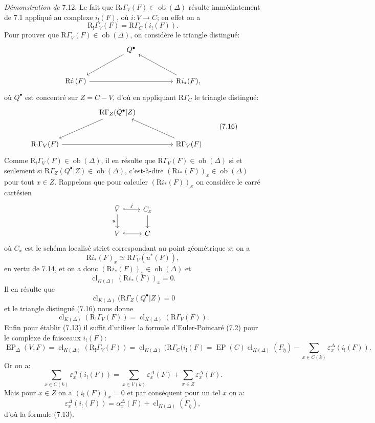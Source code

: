 \documentclass[11pt]{article}
\newcommand{\R}{\mathbb{R}}\newcommand{\RHomCore}{\mathbb{R}\mathrm{Hom}}
\providecommand{\EP}{\operatorname{EP}}
\providecommand{\Ob}{\operatorname{ob}}
\providecommand{\Ob}{\operatorname{ob}}
\providecommand{\R}{\mathrm R}
\providecommand{\EP}{\operatorname{EP}}
\providecommand{\Ob}{\operatorname{Ob}}
\providecommand{\clK}[1]{\operatorname{cl}_{K(#1)}}
\providecommand{\RG}{\R\Gamma}
\providecommand{\Ob}{\operatorname{ob}}
\providecommand{\Ob}{\operatorname{Ob}}
\begin{document}
\emph{Démonstration de} 7.12. Le fait que $\mathrm{R}_!\Gamma_V(F)\in\Ob(\Delta)$ résulte immédiatement de 7.1 appliqué au complexe $i_!(F)$, où $i:V\to C$; en effet on a
\[
\mathrm{R}_!\Gamma_V(F)=\mathrm{R}\Gamma_C(i_!(F)).
\]
Pour prouver que $\mathrm{R}\Gamma_V(F)\in\Ob(\Delta)$, on considère le triangle distingué:
\[
\begin{tikzcd}[column sep=huge,row sep=large]
& Q^\bullet \arrow[dl] &\\
\mathrm{R} i_!(F) \arrow[rr] && \mathrm{R} i_*(F) \arrow[ul],
\end{tikzcd}
\]
où $Q^\bullet$ est concentré sur $Z=C-V$, d'où en appliquant $\mathrm{R}\Gamma_C$ le triangle distingué:
\[
\begin{tikzcd}[column sep=huge,row sep=large]
& \mathrm{R}\Gamma_Z(Q^\bullet|Z) \arrow[dl] &\\
\mathrm{R}_!\Gamma_V(F) \arrow[rr] && \RG_V(F) \arrow[ul]
\end{tikzcd}
\tag{7.16}
\]
Comme $\mathrm{R}_!\Gamma_V(F)\in\Ob(\Delta)$, il en résulte que $\mathrm{R}\Gamma_V(F)\in\Ob(\Delta)$ si et seulement si $\mathrm{R}\Gamma_Z(Q^\bullet|Z)\in\Ob(\Delta)$, c'est-à-dire $(\mathrm{R} i_*(F))_x\in\Ob(\Delta)$ pour tout $x\in Z$. Rappelons que pour calculer $(\mathrm{R} i_*(F))_x$ on considère le carré cartésien
\[
\begin{tikzcd}
\bar V \arrow[r,hook,"j"] \arrow[d,"u"'] & C_x \arrow[d]\\
V \arrow[r,hook] & C
\end{tikzcd}
\]
où $C_x$ est le schéma localisé strict correspondant au point géométrique $x$; on a
\[
\mathrm{R} i_*(F)_x\simeq \mathrm{R}\Gamma_V(u^*(F)),
\]
en vertu de 7.14, et on a 
donc $(\mathrm{R} i_*(F))_x\in\Ob(\Delta)$ et
\[
\clK{\Delta}(\mathrm{R} i_*(F))_x=0.
\]
Il en résulte que
\[
\clK{\Delta}(\mathrm{R}\Gamma_Z(Q^\bullet|Z)=0
\]
et le
triangle distingué (7.16) nous donne
\[
\clK{\Delta}(\mathrm{R}_!\Gamma_V(F))=\clK{\Delta}(\mathrm{R}\Gamma_V(F)).
\]
Enfin pour établir (7.13) il suffit d'utiliser la formule d'Euler-Poincaré (7.2) pour le complexe de faisceaux $i_!(F)$:
\[
\EP_\Delta(V,F)
=
\clK{\Delta}(\mathrm{R}_!\Gamma_V(F))
=
\clK{\Delta}(\mathrm{R}\Gamma_C(i_!(F)
=
\EP(C)\clK{\Delta}(F_{\bar\eta})
-\sum_{x\in C(k)}\varepsilon_x^\Delta(i_!(F)).
\]
Or on a:
\[
\sum_{x\in C(k)}\varepsilon_x^\Delta(i_!(F))
=
\sum_{x\in V(k)}\varepsilon_x^\Delta(F)
+\sum_{x\in Z}\varepsilon_x^\Delta(F).
\]
Mais pour $x\in Z$ on a $(i_!(F))_x=0$ et par conséquent pour un tel $x$ on a:
\[
\varepsilon_x^\Delta(i_!(F))
=
\alpha_x^\Delta(F)+\clK{\Delta}(F_{\bar\eta}),
\]
d'où la formule (7.13).
\end{document}
